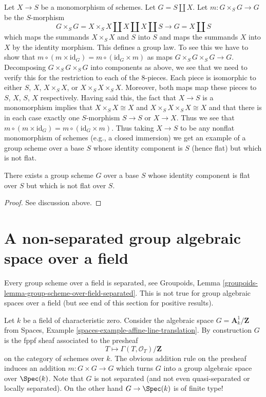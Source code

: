 \noindent
Let $X \to S$ be a monomorphism of schemes. Let $G = S \amalg X$.
Let $m : G \times_S G \to G$ be the $S$-morphism
$$
G \times_S G = X \times_S X \amalg X \amalg X \amalg S
\longrightarrow G = X \amalg S
$$
which maps the summands $X \times_S X$ and $S$ into $S$ and
maps the summands $X$ into $X$ by the identity morphism.
This defines a group law. To see this we have to show that
$m \circ (m \times \text{id}_G) = m \circ (\text{id}_G \times m)$
as maps $G \times_S G \times_S G \to G$. Decomposing
$G \times_S G \times_S G$ into components as above, we see that
we need to verify this for the restriction to each of the $8$-pieces.
Each piece is isomorphic to either $S$, $X$, $X \times_S X$, or
$X \times_S X \times_S X$. Moreover, both maps map these pieces
to $S$, $X$, $S$, $X$ respectively. Having said this, the fact that
$X \to S$ is a monomorphism implies that $X \times_S X \cong X$
and $X \times_S X \times_S X \cong X$ and that there is in each case
exactly one $S$-morphism $S \to S$ or $X \to X$. Thus we see
that $m \circ (m \times \text{id}_G) = m \circ (\text{id}_G \times m)$.
Thus taking $X \to S$ to be any
nonflat monomorphism of schemes (e.g., a closed immersion)
we get an example of a group scheme
over a base $S$ whose identity component is $S$ (hence flat)
but which is not flat.

\begin{lemma}
\label{lemma-non-flat-group-scheme}
There exists a group scheme $G$ over a base $S$ whose identity
component is flat over $S$ but which is not flat over $S$.
\end{lemma}

\begin{proof}
See discussion above.
\end{proof}




\section{A non-separated group algebraic space over a field}
\label{section-non-separated-group-space}

\noindent
Every group scheme over a field is separated, see
Groupoids, Lemma \ref{groupoids-lemma-group-scheme-over-field-separated}.
This is not true for group algebraic spaces over a field
(but see end of this section for positive results).

\medskip\noindent
Let $k$ be a field of characteristic zero.
Consider the algebraic space $G = \mathbf{A}^1_k/\mathbf{Z}$ from
Spaces, Example \ref{spaces-example-affine-line-translation}.
By construction $G$ is the fppf sheaf associated to the presheaf
$$
T \longmapsto \Gamma(T, \mathcal{O}_T) / \mathbf{Z}
$$
on the category of schemes over $k$. The obvious addition rule on the presheaf
induces an addition $m : G \times G \to G$ which turns $G$ into a group
algebraic space over $\Spec(k)$. Note that $G$ is not separated
(and not even quasi-separated or locally separated). On the other hand
$G \to \Spec(k)$ is of finite type!

